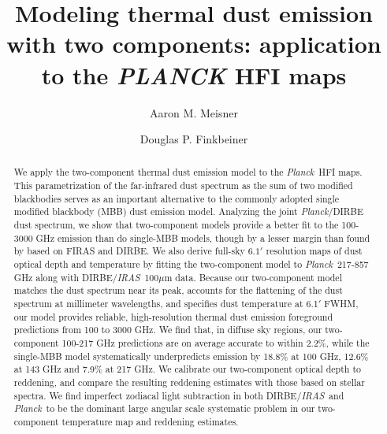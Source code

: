 \documentclass{emulateapj}
\newcommand{\IRAS}{{\it IRAS}}
\newcommand{\PLANCK}{{\it Planck}}
\begin{document}
\title{Modeling thermal dust emission with two components: application to the 
{\it PLANCK} HFI maps}
\author{Aaron M. Meisner}
\author{Douglas P. Finkbeiner}

\begin{abstract}

We apply the \cite{FDS99} two-component thermal dust emission model to the
\PLANCK~HFI maps. This parametrization of the far-infrared dust spectrum as the
sum of two modified blackbodies serves as an important alternative to the 
commonly adopted single modified blackbody (MBB) dust emission model. Analyzing
the joint \PLANCK/DIRBE dust spectrum, we show that two-component models 
provide a better fit to the 100-3000 GHz emission than do single-MBB models, 
though by a lesser margin than found by \cite{FDS99} based on FIRAS and DIRBE. 
We also derive full-sky $6.1'$ resolution maps of dust optical depth and 
temperature by fitting the two-component model to \PLANCK~217-857 GHz along 
with  DIRBE/\IRAS~100$\mu$m data. Because our two-component model
matches the dust spectrum near its peak, accounts for the flattening of the 
dust spectrum at millimeter wavelengths, and specifies dust temperature at 
6.1$'$ FWHM, our model provides reliable, high-resolution thermal dust emission
foreground predictions from 100 to 3000 GHz. We find that, in diffuse sky 
regions, our two-component 100-217 GHz predictions are on
average accurate to within 2.2\%, while the \cite{planckdust} single-MBB model 
systematically underpredicts emission by 18.8\% at 100 GHz, 12.6\% at 143 GHz 
and 7.9\% at 217 GHz. We calibrate our two-component optical depth to 
reddening, and compare the resulting reddening estimates with 
those based on stellar spectra. We find imperfect zodiacal light subtraction in
both DIRBE/\IRAS~and \PLANCK~to be the dominant large angular scale systematic 
problem in our two-component temperature map and reddening estimates.

\end{abstract}
\end{document}

